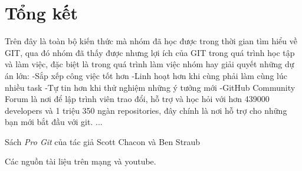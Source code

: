 \documentclass[12pt,a4paper]{report}
\begin{document}
\chapter{Tổng kết} %
\hspace{0.6cm} Trên đây  là toàn bộ kiến thức mà nhóm đã học được trong thời gian tìm hiểu về GIT, qua đó nhóm đã thấy được nhưng lợi ích của GIT trong quá trình học tập và làm việc, đặc biệt là trong quá trình làm việc nhóm hay giải quyết những dự án lớn:\vskip 0.4cm
-Sắp xếp công việc tốt hơn\vskip 0.4cm
-Linh hoạt hơn khi cùng phải làm cùng lúc nhiều task\vskip 0.4cm
-Tự tin hơn khi thử nghiệm những ý tưởng mới \vskip 0.4cm
-GitHub Community Forum là nơi để lập trình viên trao đổi, hỗ trợ và học hỏi với hơn 439000 developers và 1 triệu 350 ngàn repositories, đây chính là nơi hỗ trợ cho những bạn mới bắt đầu với git.\vskip 0.4cm
...\vskip 0.4cm

\begin{thebibliography}{99} %


 Sách {\it Pro Git} của tác giả Scott Chacon và Ben Straub

 Các nguồn tài liệu trên mạng và youtube.


\end{thebibliography}
\end{document}
